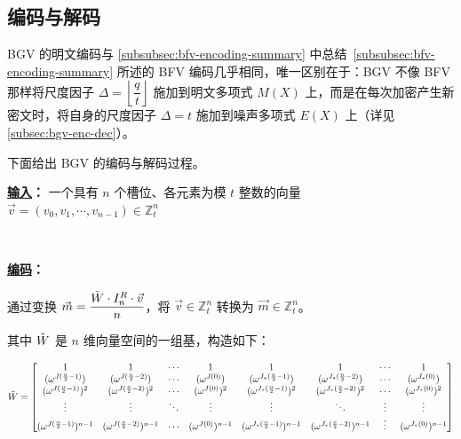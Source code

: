 \clearpage

\subsection{编码与解码}
\label{subsec:bgv-encoding-decoding}

BGV 的明文编码与 \autoref{subsubsec:bfv-encoding-summary} 中总结~\ref{subsubsec:bfv-encoding-summary} 所述的 BFV 编码几乎相同，唯一区别在于：BGV 不像 BFV 那样将尺度因子 $\Delta = \left\lfloor\dfrac{q}{t}\right\rfloor$ 施加到明文多项式 $M(X)$ 上，而是在每次加密产生新密文时，将自身的尺度因子 $\Delta = t$ 施加到噪声多项式 $E(X)$ 上（详见 \autoref{subsec:bgv-enc-dec}）。

下面给出 BGV 的编码与解码过程。

\begin{tcolorbox}[title={\textbf{\tboxlabel{\ref*{subsec:bgv-encoding-decoding}} BGV 的编码与解码}}]



\textbf{\underline{输入}：} 一个具有 $n$ 个槽位、各元素为模 $t$ 整数的向量 $\vec{v} = (v_0, v_1, \cdots, v_{n-1}) \in \mathbb{Z}_t^n$

$ $

\textbf{\underline{编码}：}

通过变换 $\vec{m} = \dfrac{\tilde W \cdot I_n^R \cdot \vec{v}}{n}$，将 $\vec{v} \in \mathbb{Z}_t^n$ 转换为 $\vec{m} \in \mathbb{Z}_t^n$。

其中 $\tilde W$ 是 $n$ 维向量空间的一组基，构造如下：

{\footnotesize{$\tilde W = \begin{bmatrix}
1 & 1 & \cdots & 1 & 1 & 1 & \cdots & 1\\
(\omega^{J(\frac{n}{2} - 1)}) & (\omega^{J(\frac{n}{2} - 2)}) & \cdots & (\omega^{J(0)}) & (\omega^{J_*(\frac{n}{2} - 1)}) & (\omega^{J_*(\frac{n}{2} - 2)}) & \cdots & (\omega^{J_*(0)})\\
(\omega^{J(\frac{n}{2} - 1)})^2 & (\omega^{J(\frac{n}{2} - 2)})^2 & \cdots & (\omega^{J(0)})^2 & (\omega^{J_*(\frac{n}{2} - 1)})^2 & (\omega^{J_*(\frac{n}{2} - 2)})^2 & \cdots & (\omega^{J_*(0)})^2 \\
\vdots & \vdots & \ddots & \vdots & \vdots & \ddots & \vdots & \vdots \\
(\omega^{J(\frac{n}{2} - 1)})^{n-1} & (\omega^{J(\frac{n}{2} - 2)})^{n-1} & \cdots & (\omega^{J(0)})^{n-1} & (\omega^{J_*(\frac{n}{2} - 1)})^{n-1} & (\omega^{J_*(\frac{n}{2} - 2)})^{n-1} & \vdots  & (\omega^{J_*(0)})^{n-1}
\end{bmatrix}$}}


\end{tcolorbox}
